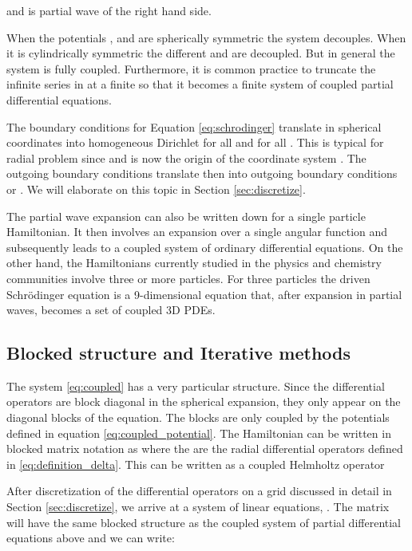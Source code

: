 \documentclass[mathpazo]{cicp}
\theoremstyle{definition}
\numberwithin{equation}{section}
\providecommand{\wv}{}
\providecommand{\hbz}{}
\begin{document}
and  is partial wave of the right hand side.

When the potentials ,  and  are spherical\hbz{ly} symmetric
the system decouples. When it is c\hbz{y}lindrical\hbz{ly} symmetric the different
 and  are decoupled. \wv{But in general the system is fully coupled.} Furthermore, it is common practice to
truncate the infinite series in  at a finite  so that it
becomes a finite system of coupled partial differential equations.


\wv{ The boundary conditions \hbz{for Equation} \eqref{eq:schrodinger} translate in spherical coordinates into
  homogeneous Dirichlet  for all  and
   for all .  \wv{This is typical for radial problem since  and  is now the origin of the coordinate system \cite{arfken}.} The outgoing boundary conditions
  translate then into outgoing boundary conditions  or . We will \hbz{elaborate on this
  topic in Section \ref{sec:discretize}}.}

\wv{The partial wave expansion can also be written down for a single
  particle Hamiltonian. It then involves an expansion over \hbz{a} single
  angular function  \hbz{and subsequently} leads to a coupled system of
  ordinary differential equations. On the other hand, the Hamiltonians
   currently studied in the physics and chemistry communit\hbz{ies involve}
  three or more particles.  For three particles the driven
  Schr\"odinger equation is a 9-dimensional equation that, after
  expansion in partial waves, becomes a set of coupled 3D PDEs.}

\subsection{Blocked structure and Iterative methods}
The system \eqref{eq:coupled} has a very particular structure.  Since
the differential operators are block diagonal in the spherical
expansion, they only appear on the diagonal blocks of the
equation. The blocks are only coupled by the potentials \wv{defined in
  equation \eqref{eq:coupled_potential}}. \wv{The Hamiltonian
   can be written in blocked matrix notation as
}
where the  are the radial differential operators
defined in \eqref{eq:definition_delta}. This can be written as a
coupled Helmholtz operator  \wv{}

After discretization of the differential operators on a grid \hbz{discussed in detail in Section \ref{sec:discretize}, we arrive at a system of linear equations,} . The matrix \hbz{} will have the same blocked structure as the coupled system of partial differential equations above and we can write:
\end{document}
